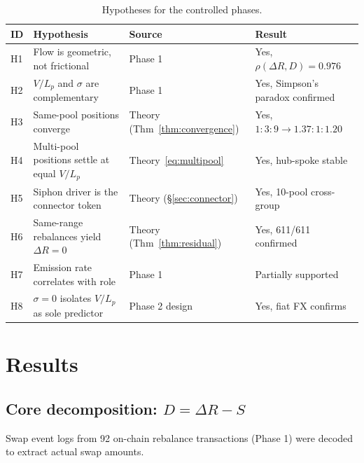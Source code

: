 \documentclass[11pt,a4paper]{article}
\begin{document}
\begin{table}[H]
\centering
\caption{Hypotheses for the controlled phases.}\label{tab:hypotheses}
\begin{tabular}{@{}lL{5.5cm}lL{5cm}@{}}
\toprule
ID & Hypothesis & Source & Result \\
\midrule
H1 & Flow is geometric, not frictional       & Phase 1            & Yes, $\rho(\Delta R, D) = 0.976$ \\
H2 & $V/L_p$ and $\sigma$ are complementary    & Phase 1            & Yes, Simpson's paradox confirmed \\
H3 & Same-pool positions converge            & Theory (Thm~\ref{thm:convergence}) & Yes, $1{:}3{:}9 \to 1.37{:}1{:}1.20$ \\
H4 & Multi-pool positions settle at equal $V/L_p$ & Theory~\eqref{eq:multipool} & Yes, hub-spoke stable \\
H5 & Siphon driver is the connector token    & Theory (\S\ref{sec:connector}) & Yes, 10-pool cross-group \\
H6 & Same-range rebalances yield $\Delta R = 0$ & Theory (Thm~\ref{thm:residual}) & Yes, 611/611 confirmed \\
H7 & Emission rate correlates with role      & Phase 1            & Partially supported \\
H8 & $\sigma = 0$ isolates $V/L_p$ as sole predictor & Phase 2 design & Yes, fiat FX confirms \\
\bottomrule
\end{tabular}
\end{table}

\section{Results}\label{sec:results}

\subsection{Core decomposition: \texorpdfstring{$D = \Delta R - S$}{D = Delta R - S}}\label{sec:decomposition}

Swap event logs from 92 on-chain rebalance transactions (Phase 1) were decoded to extract actual swap amounts.
\end{document}
